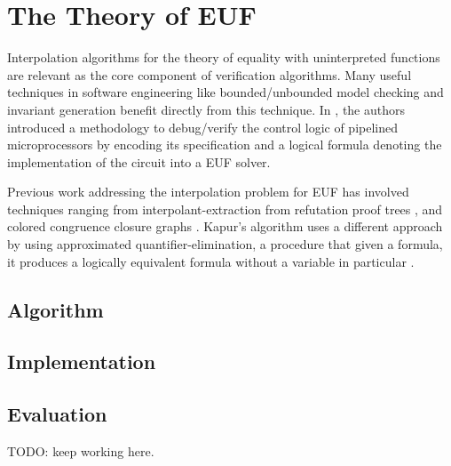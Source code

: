 \chapter{The Theory of EUF}

Interpolation algorithms for the theory of equality 
with uninterpreted functions are relevant as the core 
component of verification algorithms. Many useful techniques 
in software engineering like bounded/unbounded model 
checking and invariant generation benefit directly from 
this technique. In \cite{10.1007/3-540-58179-0_44}, the 
authors introduced a methodology to debug/verify the 
control logic of pipelined microprocessors by encoding 
its specification and a logical formula denoting the 
implementation of the circuit into a EUF solver.

Previous work addressing the interpolation problem for 
EUF has involved techniques ranging from
interpolant-extraction from refutation proof 
trees \cite{10.1007/978-3-540-24730-2_2, mcmillan2011interpolants, 
10.1007/978-3-642-31612-8_24}, and colored congruence closure
graphs \cite{10.1007/978-3-642-00768-2_34}. Kapur's algorithm 
uses a different approach by using approximated
quantifier-elimination, a procedure that given a formula, 
it produces a logically equivalent formula
 without a variable in particular \cite{DBLP:books/daglib/0076838}.

\section{Algorithm}



%

\section{Implementation}



\section{Evaluation}

TODO: keep working here.

